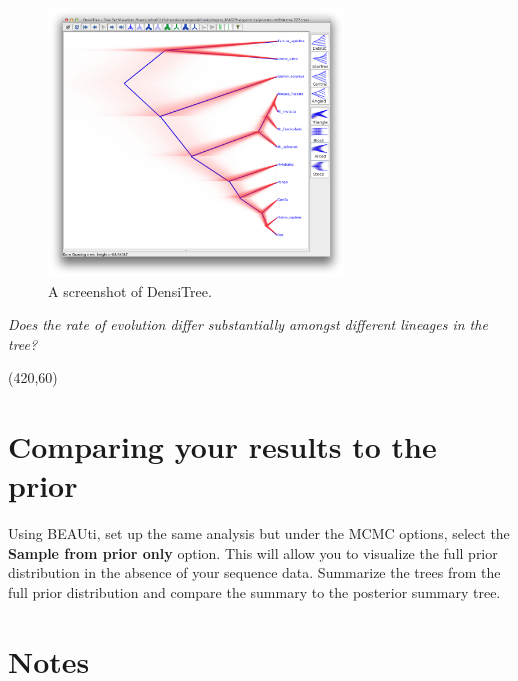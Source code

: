 \documentclass[11pt]{article}
\theoremstyle{plain}%
\theoremstyle{definition}
\theoremstyle{remark}
\begin{document}
\begin{figure}
\begin{center}
\includegraphics[width=0.7\textwidth]{figures/DensiTree}
\end{center}
\caption{A screenshot of DensiTree.}
\label{fig:DensiTree}
\end{figure}

\textit{Does the rate of evolution differ substantially amongst different lineages in the tree?}

\vspace{5 mm}
\framebox(420,60){}
\vspace{5 mm}

\section{Comparing your results to the prior}

Using BEAUti, set up the same analysis but under the MCMC options, select the {\bf Sample from prior only} option. This will allow you to visualize the full prior distribution in the absence of your sequence data. Summarize the trees from the full prior
distribution and compare the summary to the posterior summary tree.




 









\newpage
\section*{Notes}
\end{document}
